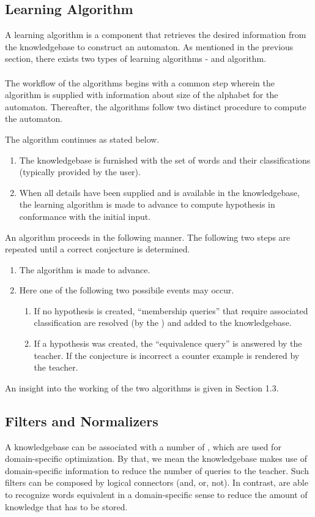 \subsection{Learning Algorithm}
	A learning algorithm is a component that retrieves the desired information from the knowledgebase to construct an automaton. As mentioned in the previous section, there exists two types of learning algorithms - \offline and \online algorithm. 
	\paragraph{}
	The workflow of the algorithms begins with a common step wherein the algorithm is supplied with information about size of the alphabet for the automaton. Thereafter, the algorithms follow two distinct procedure to compute the automaton.
	
	The \offline algorithm continues as stated below.
\begin{enumerate}
	\item The knowledgebase is furnished with the set of words and their classifications (typically provided by the user).
	\item When all details have been supplied and is available in the knowledgebase, the learning algorithm is made to advance to compute  hypothesis in conformance with the initial input.
\end{enumerate}

	An \online algorithm proceeds in the following manner.
	The following two steps are repeated until a correct conjecture is determined.
\begin{enumerate}
\item The algorithm is made to advance.
\item Here one of the following two possibile events may occur.
\begin{enumerate}
\item If no hypothesis is created, ``membership queries'' that require associated classification are resolved (by the \teacher) and added to the knowledgebase.
\item If a hypothesis was created, the ``equivalence query'' is answered by the teacher. If the conjecture is incorrect a counter example is rendered by the teacher.
\end{enumerate}
\end{enumerate}	
	
An insight into the working of the two algorithms is given in Section 1.3.
	
\subsection{Filters and Normalizers}	
	A knowledgebase can be associated with a number of \filters, which are used for domain-specific optimization. By that, we mean the knowledgebase makes use of domain-specific information to reduce the number of queries to the teacher. Such filters can be composed by logical connectors (and, or, not). In contrast, \normalizers are able to recognize words equivalent in a domain-specific sense to reduce the amount of knowledge that has to be stored. 
		
